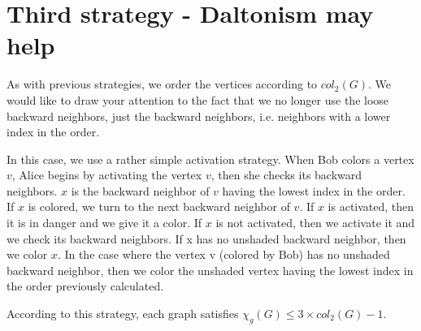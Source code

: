 \section{Third strategy - Daltonism may help}

As with previous strategies, we order the vertices according to $col_{2}(G)$.
We would like to draw your attention to the fact that we no longer use the loose backward neighbors, just the backward neighbors, i.e. neighbors with a lower index in the order.

In this case, we use a rather simple activation strategy.
When Bob colors a vertex $v$, Alice begins by activating the vertex $v$, then she checks its backward neighbors.
$x$ is the backward neighbor of $v$ having the lowest index in the order.
If $x$ is colored, we turn to the next backward neighbor of $v$. If $x$ is activated, then it is in danger and we give it a color. If $x$ is not activated, then we activate it and we check its backward neighbors. If x has no unshaded backward neighbor, then we color $x$.
In the case where the vertex v (colored by Bob) has no unshaded backward neighbor, then we color the unshaded vertex having the lowest index in the order previously calculated.


According to this strategy, each graph satisfies $\chi_{g}(G) \leq 3 \times col_{2}(G) - 1$.